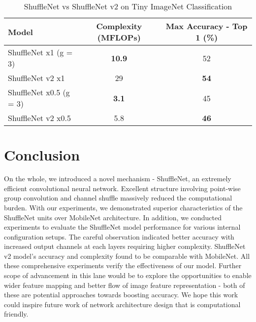 \documentclass{article}
\begin{document}
\begin{table}[H]
  \caption{ShuffleNet vs ShuffleNet v2 on Tiny ImageNet Classification}
  \label{sample-table}
  \centering
  \begin{tabular}{lcc}
    \toprule
    Model     & Complexity (MFLOPs) & Max Accuracy - Top 1 (\%)    \\
    \midrule
    ShuffleNet x1 (g = 3) & \textbf{10.9} & 52   \\
    ShuffleNet v2 x1 & 29 & \textbf{54} \\
    \midrule
    ShuffleNet x0.5 (g = 3) & \textbf{3.1} & 45    \\
    ShuffleNet v2 x0.5 & 5.8 & \textbf{46} \\
    \bottomrule
  \end{tabular}
\end{table}


\section{Conclusion}
On the whole, we introduced a novel mechanism - ShuffleNet, an extremely efficient convolutional neural network. Excellent structure involving point-wise group convolution and channel shuffle massively reduced the computational burden. With our experiments, we demonstrated superior characteristics of the ShuffleNet units over MobileNet architecture. In addition, we conducted experiments to evaluate the ShuffleNet model performance for various internal configuration setups. The careful observation indicated better accuracy with increased output channels at each layers requiring higher complexity. ShuffleNet v2 model's accuracy and complexity found to be comparable with MobileNet. All these comprehensive experiments verify the effectiveness of our model. Further scope of advancement in this lane would be to explore the opportunities to enable wider feature mapping and better flow of image feature representation - both of these are potential approaches towards boosting accuracy.
We hope this work could inspire future work of network architecture design that is computational friendly.
\end{document}
